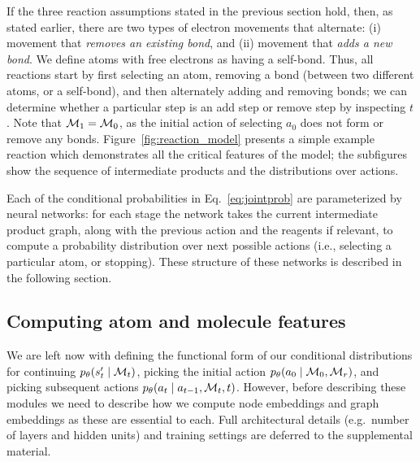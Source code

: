 If the three reaction assumptions stated in the previous section hold, then, as stated earlier, there are two types of electron movements that alternate: 
(i) movement that \emph{removes an existing bond}, and 
(ii) movement that \emph{adds a new bond}. 
We define atoms with free electrons as having a self-bond.
Thus, all reactions start by first selecting an atom, removing a bond (between two different atoms, or a self-bond), and then alternately adding and removing bonds;
we can determine whether a particular step is an add step or remove step by inspecting $t$.
Note that ${\mathcal{M}}_1 = {\mathcal{M}}_0$, as the initial action of selecting $a_0$ does not form or remove any bonds.
Figure~\ref{fig:reaction_model} presents a simple example reaction which demonstrates all the critical features of the model;
the subfigures show the sequence of intermediate products and the distributions over actions.


Each of the conditional probabilities in Eq.~\eqref{eq:jointprob} are parameterized by neural networks:
for each stage the network takes the current intermediate product graph, 
along with the previous action and the reagents if relevant, 
to compute a probability distribution over next possible actions (i.e., selecting a particular atom, or stopping).
These structure of these networks is described in the following section.

\subsection{Computing atom and molecule features}


We are left now with defining the functional form of our conditional distributions for continuing $p_\theta(s'_t \mid {\mathcal{M}}_t)$, picking the initial action $p_\theta(a_0 \mid {\mathcal{M}}_0, {\mathcal{M}}_r)$, and picking subsequent actions $p_\theta(a_t \mid a_{t-1}, {\mathcal{M}}_t, t)$.
However, before describing these modules we need to describe how we compute node embeddings and graph embeddings as these  are  essential to each.
Full architectural details (e.g.\ number of layers and hidden units) 
and training settings are deferred to the supplemental material.

